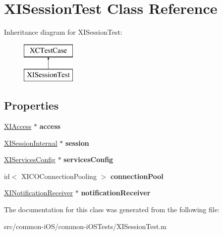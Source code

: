 \hypertarget{interface_x_i_session_test}{}\section{X\+I\+Session\+Test Class Reference}
\label{interface_x_i_session_test}
Inheritance diagram for X\+I\+Session\+Test\+:\begin{figure}[H]
\begin{center}
\leavevmode
\includegraphics[height=2.000000cm]{interface_x_i_session_test}
\end{center}
\end{figure}
\subsection*{Properties}
\begin{DoxyCompactItemize}
\item 
\hypertarget{interface_x_i_session_test_a45ec6e10cf6087ad02cfd9a0062b7fc9}{}\label{interface_x_i_session_test_a45ec6e10cf6087ad02cfd9a0062b7fc9} 
\hyperlink{class_x_i_access}{X\+I\+Access} $\ast$ {\bfseries access}
\item 
\hypertarget{interface_x_i_session_test_ad8223baf0620fa41695f2328da220f86}{}\label{interface_x_i_session_test_ad8223baf0620fa41695f2328da220f86} 
\hyperlink{interface_x_i_session_internal}{X\+I\+Session\+Internal} $\ast$ {\bfseries session}
\item 
\hypertarget{interface_x_i_session_test_a644eccfcaf2ba3de2c0e227400130d25}{}\label{interface_x_i_session_test_a644eccfcaf2ba3de2c0e227400130d25} 
\hyperlink{interface_x_i_services_config}{X\+I\+Services\+Config} $\ast$ {\bfseries services\+Config}
\item 
\hypertarget{interface_x_i_session_test_aa60fdbd4c68c3d68a4f52e0b3d392045}{}\label{interface_x_i_session_test_aa60fdbd4c68c3d68a4f52e0b3d392045} 
id$<$ X\+I\+C\+O\+Connection\+Pooling $>$ {\bfseries connection\+Pool}
\item 
\hypertarget{interface_x_i_session_test_a02102c5eb867bfb50641f39d4ac65016}{}\label{interface_x_i_session_test_a02102c5eb867bfb50641f39d4ac65016} 
\hyperlink{interface_x_i_notification_receiver}{X\+I\+Notification\+Receiver} $\ast$ {\bfseries notification\+Receiver}
\end{DoxyCompactItemize}


The documentation for this class was generated from the following file\+:\begin{DoxyCompactItemize}
\item 
src/common-\/i\+O\+S/common-\/i\+O\+S\+Tests/X\+I\+Session\+Test.\+m\end{DoxyCompactItemize}
